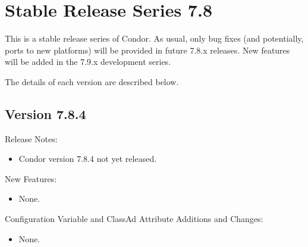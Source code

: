 
\section{\label{sec:History-7-8}Stable Release Series 7.8}

This is a stable release series of Condor.
As usual, only bug fixes (and potentially, ports to new platforms)
will be provided in future 7.8.x releases.
New features will be added in the 7.9.x development series.

The details of each version are described below.

\subsection*{\label{sec:New-7-8-4}Version 7.8.4}

\noindent Release Notes:

\begin{itemize}

\item Condor version 7.8.4 not yet released.

\end{itemize}


\noindent New Features:

\begin{itemize}

\item None.

\end{itemize}

\noindent Configuration Variable and ClassAd Attribute Additions and Changes:

\begin{itemize}

\item None.

\end{itemize}

